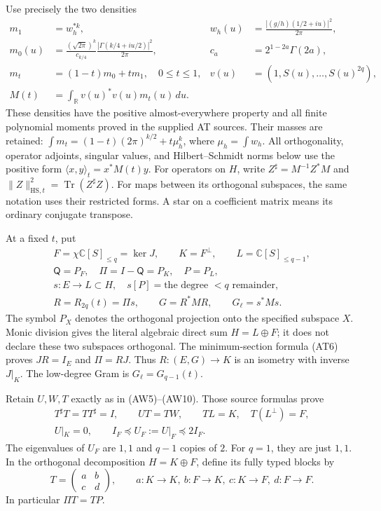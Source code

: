 Use precisely the two densities
\[
 \begin{aligned}
 m_1&=w_h^{*k},&
 w_h(u)&=\frac{|(g/h)(1/2+iu)|^2}{2\pi},\\
 m_0(u)&=\frac{(\sqrt{2\pi})^k}{c_{k/4}}
                  \frac{|\Gamma(k/4+iu/2)|^2}{2\pi},&
 c_a&=2^{1-2a}\Gamma(2a),\\
 m_t&=(1-t)m_0+tm_1,\quad 0\le t\le1,&
 v(u)&=(1,S(u),\ldots,S(u)^{2q}),\\
 M(t)&=\int_{\mathbb R}v(u)^*v(u)m_t(u)\,du.
 \end{aligned}
 \tag{QT.3}\label{CFStage:eq:qt-metric}
\]
These densities have the positive almost-everywhere property and all
finite polynomial moments proved in the supplied AT sources. Their
masses are retained:
\(\int m_t=(1-t)(2\pi)^{k/2}+t\mu_h^k\), where
\(\mu_h=\int w_h\).
All orthogonality, operator adjoints, singular values, and
Hilbert--Schmidt norms below use the positive form
\(\langle x,y\rangle_t=x^*M(t)y\).
For operators on \(H\), write \(Z^\sharp=M^{-1}Z^*M\) and
\(\|Z\|_{\mathrm{HS},t}^2=\operatorname{Tr}(Z^\sharp Z)\).
For maps between its orthogonal subspaces, the same notation uses their
restricted forms. A star on a coefficient matrix means its ordinary
conjugate transpose.

At a fixed \(t\), put
\[
 \begin{gathered}
 F=\chi\mathbb C[S]_{\le q}=\ker J,\qquad K=F^\perp,\qquad
 L=\mathbb C[S]_{\le q-1},\\
 \mathsf Q=P_F,\quad \Pi=I-\mathsf Q=P_K,\quad P=P_L,\\
 s:E\longrightarrow L\subset H,\quad s[P]=\text{the degree }<q
       \text{ remainder},\\
 R=R_{2q}(t)=\Pi s,\qquad
 G=R^*MR,\qquad G_\ell=s^*Ms.
 \end{gathered}
 \tag{QT.4}\label{CFStage:eq:qt-splitting}
\]
The symbol \(P_X\) denotes the orthogonal projection onto the specified
subspace \(X\). Monic division gives the literal algebraic direct sum
\(H=L\oplus F\); it does not declare these two subspaces orthogonal.
The minimum-section formula (AT6) proves \(JR=I_E\) and
\(\Pi=RJ\). Thus \(R:(E,G)\to K\) is an isometry with inverse
\(J|_K\). The low-degree Gram is \(G_\ell=G_{q-1}(t)\).

Retain \(U,W,T\) exactly as in (AW5)--(AW10). Those source formulas prove
\[
 \begin{gathered}
 T^\sharp T=TT^\sharp=I,\qquad UT=TW,\qquad
 TL=K,\quad T(L^\perp)=F,\\
 U|_K=0,\qquad I_F\preceq U_F:=U|_F\preceq2I_F.
 \end{gathered}
 \tag{QT.5}\label{CFStage:eq:qt-inputT}
\]
The eigenvalues of \(U_F\) are \(1,1\) and \(q-1\) copies of \(2\).
For \(q=1\), they are just \(1,1\).
In the orthogonal decomposition \(H=K\oplus F\), define its fully typed
blocks by
\[
 T=\begin{pmatrix}a&b\\c&d\end{pmatrix},\qquad
 a:K\to K,\ b:F\to K,\ c:K\to F,\ d:F\to F.
 \tag{QT.6}\label{CFStage:eq:qt-blocks}
\]
In particular \(\Pi T=TP\).

